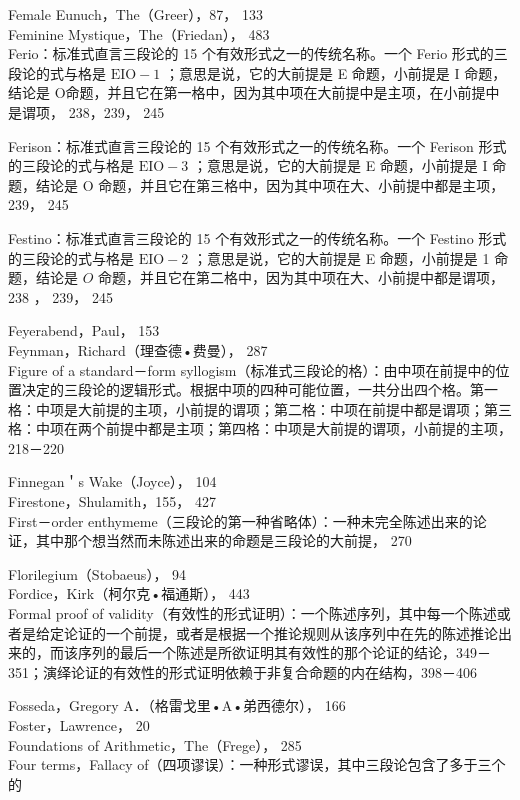 Female Eunuch，The（Greer），87， 133\\
Feminine Mystique，The（Friedan）， 483\\
Ferio：标准式直言三段论的 15 个有效形式之一的传统名称。一个 Ferio 形式的三段论的式与格是 $\mathrm{EIO}-1$ ；意思是说，它的大前提是 E 命题，小前提是 I 命题，结论是 O命题，并且它在第一格中，因为其中项在大前提中是主项，在小前提中是谓项， 238，239， 245

Ferison：标准式直言三段论的 15 个有效形式之一的传统名称。一个 Ferison 形式的三段论的式与格是 $\mathrm{EIO}-3$ ；意思是说，它的大前提是 E 命题，小前提是 I 命题，结论是 O 命题，并且它在第三格中，因为其中项在大、小前提中都是主项，239， 245

Festino：标准式直言三段论的 15 个有效形式之一的传统名称。一个 Festino 形式的三段论的式与格是 $\mathrm{EIO}-2$ ；意思是说，它的大前提是 E 命题，小前提是 1 命题，结论是 $O$ 命题，并且它在第二格中，因为其中项在大、小前提中都是谓项， 238 ， 239， 245

Feyerabend，Paul， 153\\
Feynman，Richard（理查德•费曼）， 287\\
Figure of a standard－form syllogism（标准式三段论的格）：由中项在前提中的位置决定的三段论的逻辑形式。根据中项的四种可能位置，一共分出四个格。第一格：中项是大前提的主项，小前提的谓项；第二格：中项在前提中都是谓项；第三格：中项在两个前提中都是主项；第四格：中项是大前提的谓项，小前提的主项，218－220

Finnegan＇s Wake（Joyce）， 104\\
Firestone，Shulamith，155， 427\\
First－order enthymeme（三段论的第一种省略体）：一种未完全陈述出来的论证，其中那个想当然而未陈述出来的命题是三段论的大前提， 270

Florilegium（Stobaeus）， 94\\
Fordice，Kirk（柯尔克•福通斯）， 443\\
Formal proof of validity（有效性的形式证明）：一个陈述序列，其中每一个陈述或者是给定论证的一个前提，或者是根据一个推论规则从该序列中在先的陈述推论出来的，而该序列的最后一个陈述是所欲证明其有效性的那个论证的结论，349－351；演绎论证的有效性的形式证明依赖于非复合命题的内在结构，398－406

Fosseda，Gregory A．（格雷戈里•A•弟西德尔）， 166\\
Foster，Lawrence， 20\\
Foundations of Arithmetic，The（Frege）， 285\\
Four terms，Fallacy of（四项谬误）：一种形式谬误，其中三段论包含了多于三个的

